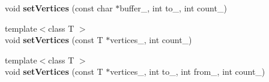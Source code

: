 \begin{DoxyCompactItemize}
\item 
void {\bfseries set\+Vertices} (const char $\ast$buffer\+\_\+, int to\+\_\+, int count\+\_\+)\hypertarget{class_i_dream_sky_1_1_g_x_vertex_buffer_ae24fd2edb9b65e435d6f57fc36de9f4d}{}\label{class_i_dream_sky_1_1_g_x_vertex_buffer_ae24fd2edb9b65e435d6f57fc36de9f4d}

\item 
{\footnotesize template$<$class T $>$ }\\void {\bfseries set\+Vertices} (const T $\ast$vertices\+\_\+, int count\+\_\+)\hypertarget{class_i_dream_sky_1_1_g_x_vertex_buffer_a2e5ae4de67bbff1e9b9be95062c70500}{}\label{class_i_dream_sky_1_1_g_x_vertex_buffer_a2e5ae4de67bbff1e9b9be95062c70500}

\item 
{\footnotesize template$<$class T $>$ }\\void {\bfseries set\+Vertices} (const T $\ast$vertices\+\_\+, int to\+\_\+, int from\+\_\+, int count\+\_\+)\hypertarget{class_i_dream_sky_1_1_g_x_vertex_buffer_a842ab0093d04e0307c7d16d641210058}{}\label{class_i_dream_sky_1_1_g_x_vertex_buffer_a842ab0093d04e0307c7d16d641210058}

\end{DoxyCompactItemize}

